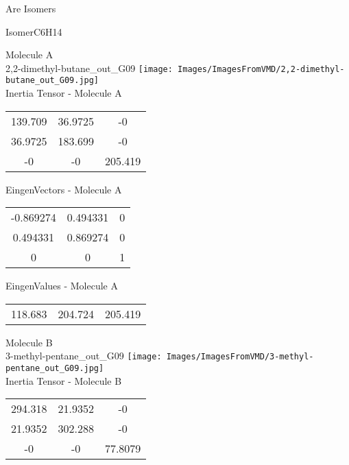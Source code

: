 \begin{center}
\vtab
\vtab
\textcolor{NavyBlue}{\Large Are Isomers}
\end{center}
\newpage

\vtab[-2cm]
\begin{center}
{\large IsomerC6H14}
\end{center}
\begin{multicols}{2}
\begin{center}
Molecule A \\ 
2,2-dimethyl-butane\_out\_G09
\texttt{[image: Images/ImagesFromVMD/2,2-dimethyl-butane\_out\_G09.jpg]}
\\
Inertia Tensor - Molecule A \\
\vtab
\begin{tabular}{|c c c|}
139.709	 & 	36.9725	 & 	-0	 \\
36.9725	 & 	183.699	 & 	-0	 \\
-0	 & 	-0	 & 	205.419
\end{tabular}

\vtab
 EingenVectors - Molecule A     \\
\vtab
\begin{tabular}{|c c c|}
-0.869274	 & 	0.494331	 & 	0	 \\
0.494331	 & 	0.869274	 & 	0	 \\
0	 & 	0	 & 	1
\end{tabular}

\vtab
 EingenValues - Molecule A     \\
\vtab
\begin{tabular}{|c c c|}
118.683	 & 	204.724	 & 	205.419
\end{tabular}
\columnbreak

Molecule B \\ 
3-methyl-pentane\_out\_G09
\texttt{[image: Images/ImagesFromVMD/3-methyl-pentane\_out\_G09.jpg]}
\\
Inertia Tensor - Molecule B \\
\vtab
\begin{tabular}{|c c c|}
294.318	 & 	21.9352	 & 	-0	 \\
21.9352	 & 	302.288	 & 	-0	 \\
-0	 & 	-0	 & 	77.8079
\end{tabular}


\end{center}
\end{multicols}
